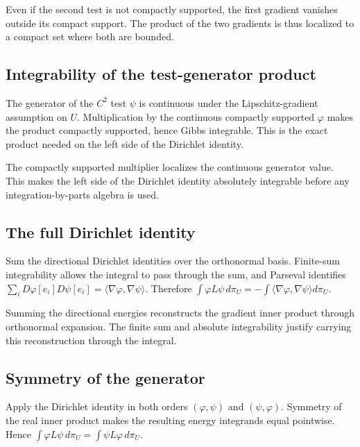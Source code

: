 \documentclass[11pt,a4paper]{article}
\begin{document}
Even if the second test is not compactly supported, the first gradient vanishes outside its compact support. The product of the two gradients is thus localized to a compact set where both are bounded.


\subsection{\texorpdfstring{Integrability of the test-generator product}{Integrability of the test-generator product}}


The generator of the \(C^2\) test \(\psi\) is continuous under the Lipschitz-gradient assumption on \(U\). Multiplication by the continuous compactly supported \(\varphi\) makes the product compactly supported, hence Gibbs integrable. This is the exact product needed on the left side of the Dirichlet identity.



The compactly supported multiplier localizes the continuous generator value. This makes the left side of the Dirichlet identity absolutely integrable before any integration-by-parts algebra is used.


\subsection{\texorpdfstring{The full Dirichlet identity}{The full Dirichlet identity}}


Sum the directional Dirichlet identities over the orthonormal basis. Finite-sum integrability allows the integral to pass through the sum, and Parseval identifies \(\sum_iD\varphi[e_i]D\psi[e_i]=\langle\nabla\varphi,\nabla\psi\rangle\). Therefore \(\int\varphi L\psi\,d\pi_U=-\int\langle\nabla\varphi,\nabla\psi\rangle d\pi_U\).



Summing the directional energies reconstructs the gradient inner product through orthonormal expansion. The finite sum and absolute integrability justify carrying this reconstruction through the integral.


\subsection{\texorpdfstring{Symmetry of the generator}{Symmetry of the generator}}


Apply the Dirichlet identity in both orders \((\varphi,\psi)\) and \((\psi,\varphi)\). Symmetry of the real inner product makes the resulting energy integrands equal pointwise. Hence \(\int\varphi L\psi\,d\pi_U=\int\psi L\varphi\,d\pi_U\).
\end{document}
